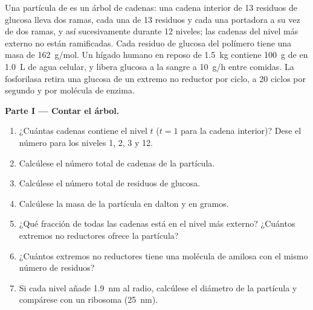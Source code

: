 \begin{problem}
\label{pb:b1:carbohydrates:1}
Una partícula de  es un árbol de cadenas: una cadena interior de
\qty{13}{} residuos de glucosa lleva dos ramas, cada una de \qty{13}{}
residuos y cada una portadora a su vez de dos ramas, y así sucesivamente
durante \qty{12}{} niveles; las cadenas del nivel más externo no están
ramificadas. Cada residuo de glucosa del polímero tiene una masa de
\qty{162}{g/mol}. Un hígado humano en reposo de \qty{1.5}{kg} contiene
\qty{100}{g} de  en \qty{1.0}{L} de agua celular, y libera glucosa
a la sangre a \qty{10}{g/h} entre comidas. La  fosforilasa retira
una glucosa de un extremo no reductor por ciclo, a \qty{20}{} ciclos por
segundo y por molécula de enzima.

\medskip
\noindent\textbf{Parte I --- Contar el árbol.}
\begin{enumerate}
  \item ¿Cuántas cadenas contiene el nivel $t$ ($t = 1$ para la cadena
        interior)? Dese el número para los niveles 1, 2, 3 y 12.
  \item Calcúlese el número total de cadenas de la partícula.
  \item Calcúlese el número total de residuos de glucosa.
  \item Calcúlese la masa de la partícula en dalton y en gramos.
  \item ¿Qué fracción de todas las cadenas está en el nivel más externo?
        ¿Cuántos extremos no reductores ofrece la partícula?
  \item ¿Cuántos extremos no reductores tiene una molécula de amilosa con
        el mismo número de residuos?
  \item Si cada nivel añade \qty{1.9}{nm} al radio, calcúlese el diámetro
        de la partícula y compárese con un ribosoma (\qty{25}{nm}).
\end{enumerate}


\end{problem}
